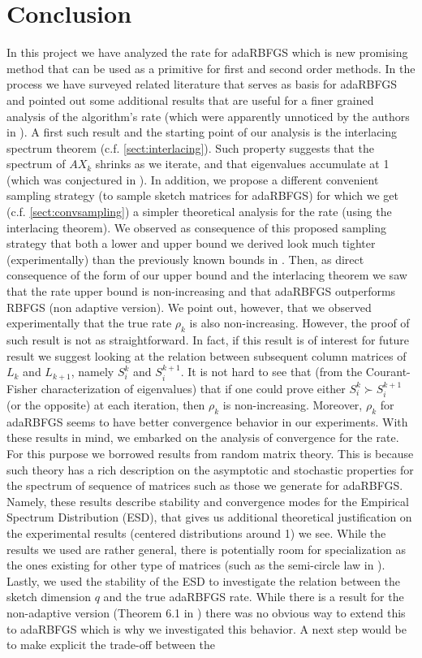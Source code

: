 \documentclass[12pt,conference,compsocconf]{IEEEtran}
\begin{document}
\section{Conclusion}\label{sect:conclusion}
In this project we have analyzed the rate for adaRBFGS which is new promising method that can be used as a primitive for first and second order methods. In the process we have surveyed related literature that serves as basis for adaRBFGS and pointed out some additional results that are useful for a finer grained analysis of the algorithm's rate (which were apparently unnoticed by the authors in \cite{Gower1}). A first such result and the starting point of our analysis is the interlacing spectrum theorem (c.f. \ref{sect:interlacing}). Such property suggests that the spectrum of $AX_k$ shrinks as we iterate, and that eigenvalues accumulate at 1 (which was conjectured in \cite{Gower1}). In addition, we propose a different convenient sampling strategy (to sample sketch matrices for adaRBFGS) for which we get (c.f. \ref{sect:convsampling}) a simpler theoretical analysis for the rate (using the interlacing theorem). We observed as consequence of this proposed sampling strategy that both a lower and upper bound we derived look much tighter (experimentally) than the previously known bounds in \cite{Gower1}. Then, as direct consequence of the form of our upper bound and the interlacing theorem we saw that the rate upper bound is non-increasing and that adaRBFGS outperforms RBFGS (non adaptive version). We point out, however, that we observed experimentally that the true rate $\rho_k$ is also non-increasing. However, the proof of such result is not as straightforward. In fact, if this result is of interest for future result we suggest looking at the relation between subsequent column matrices of $L_k$ and $L_{k+1}$, namely $S_i^k$ and $S_i^{k+1}$. It is not hard to see that (from the Courant-Fisher characterization of eigenvalues) that if one could prove either $S_i^k \succ S_i^{k+1}$ (or the opposite) at each iteration, then $\rho_k$ is non-increasing. Moreover, $\rho_k$ for adaRBFGS seems to have better convergence behavior in our experiments. With these results in mind, we embarked on the analysis of convergence for the rate. For this purpose we borrowed results from random matrix theory. This is because such theory has a rich description on the asymptotic and stochastic properties for the spectrum of sequence of matrices such as those we generate for adaRBFGS. Namely, these results describe stability and convergence modes for the Empirical Spectrum Distribution (ESD), that gives us additional theoretical justification on the experimental results (centered distributions around 1) we see. While the results we used are rather general, there is potentially room for specialization as the ones existing for other type of matrices (such as the semi-circle law in \cite{Tao}). Lastly, we used the stability of the ESD to investigate the relation between the sketch dimension $q$ and the true adaRBFGS rate. While there is a result for the non-adaptive version (Theorem 6.1 in \cite{Gower1}) there was no obvious way to extend this to adaRBFGS which is why we investigated this behavior. A next step would be to make explicit the trade-off between the 
\end{document}
